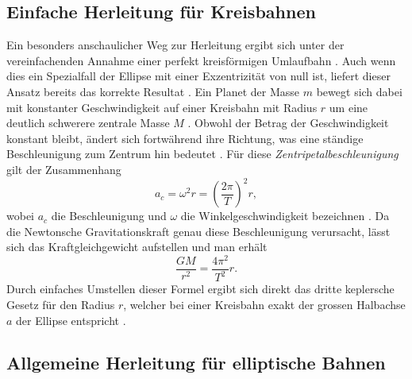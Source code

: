 %
%
%
%
\subsection{Einfache Herleitung für Kreisbahnen
    \label{kepler:subsection:kreisbahnen}}

Ein besonders anschaulicher Weg zur Herleitung ergibt sich unter der vereinfachenden Annahme einer perfekt kreisförmigen Umlaufbahn \cite{astro2012}.
Auch wenn dies ein Spezialfall der Ellipse mit einer Exzentrizität von null ist, liefert dieser Ansatz bereits das korrekte Resultat \cite{astro2012}.
Ein Planet der Masse \(m\) bewegt sich dabei mit konstanter Geschwindigkeit auf einer Kreisbahn mit Radius \(r\) um eine deutlich schwerere zentrale Masse \(M\) \cite{astro2012}.
Obwohl der Betrag der Geschwindigkeit konstant bleibt, ändert sich fortwährend ihre Richtung, was eine ständige Beschleunigung zum Zentrum hin bedeutet \cite{astro2012}.
Für diese \emph{Zentripetalbeschleunigung} gilt der Zusammenhang
\begin{equation}
    a_c = \omega^2 r = \left(\frac{2\pi}{T}\right)^2 r ,
    \label{kepler:equation:zentripetal}
\end{equation}
wobei \(a_c\) die Beschleunigung und \(\omega\) die Winkelgeschwindigkeit bezeichnen \cite{astro2012}.
Da die Newtonsche Gravitationskraft genau diese Beschleunigung verursacht, lässt sich das Kraftgleichgewicht aufstellen und man erhält
\begin{equation}
    \frac{GM}{r^2} = \frac{4\pi^2}{T^2} r .
    \label{kepler:equation:gleichgewicht}
\end{equation}
Durch einfaches Umstellen dieser Formel ergibt sich direkt das dritte keplersche Gesetz für den Radius \(r\), welcher bei einer Kreisbahn exakt der grossen Halbachse \(a\) der Ellipse entspricht \cite{astro2012}.


\subsection{Allgemeine Herleitung für elliptische Bahnen
    \label{kepler:subsection:ellipsen}}


